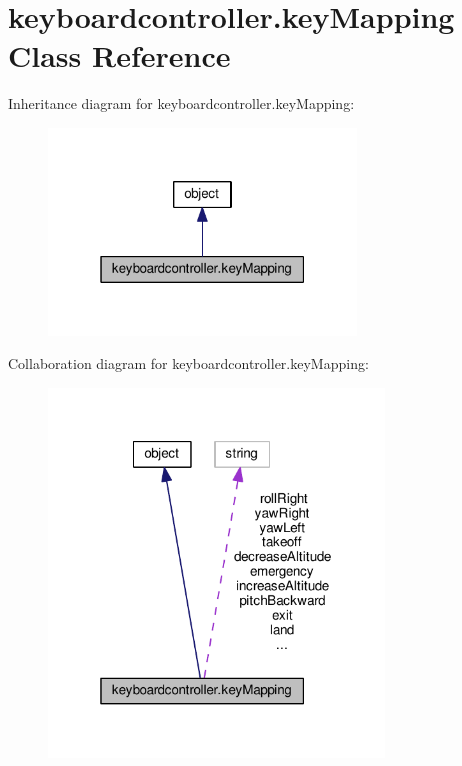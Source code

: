 \hypertarget{classkeyboardcontroller_1_1keyMapping}{\section{keyboardcontroller.\-key\-Mapping Class Reference}
\label{classkeyboardcontroller_1_1keyMapping}
}


Inheritance diagram for keyboardcontroller.\-key\-Mapping\-:
\nopagebreak
\begin{figure}[H]
\begin{center}
\leavevmode
\includegraphics[width=232pt]{classkeyboardcontroller_1_1keyMapping__inherit__graph}
\end{center}
\end{figure}


Collaboration diagram for keyboardcontroller.\-key\-Mapping\-:
\nopagebreak
\begin{figure}[H]
\begin{center}
\leavevmode
\includegraphics[width=253pt]{classkeyboardcontroller_1_1keyMapping__coll__graph}
\end{center}
\end{figure}
